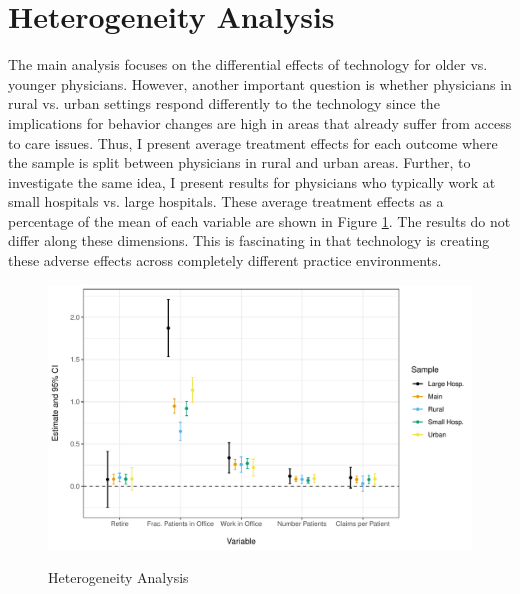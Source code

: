 \documentclass[12pt]{article}
\begin{document}
\section{Heterogeneity Analysis}

The main analysis focuses on the differential effects of technology for older vs. younger physicians. However, another important question is whether physicians in rural vs. urban settings respond differently to the technology since the implications for behavior changes are high in areas that already suffer from access to care issues. Thus, I present average treatment effects for each outcome where the sample is split between physicians in rural and urban areas. Further, to investigate the same idea, I present results for physicians who typically work at small hospitals vs. large hospitals. These average treatment effects as a percentage of the mean of each variable are shown in Figure \ref{fig:heter}. The results do not differ along these dimensions. This is fascinating in that technology is creating these adverse effects across completely different practice environments.


\begin{figure}
    \centering
    \caption{Heterogeneity Analysis}
    \includegraphics[scale=.6]{Objects/heterog_plot.pdf}
    \label{fig:heter}
\end{figure}
\end{document}
